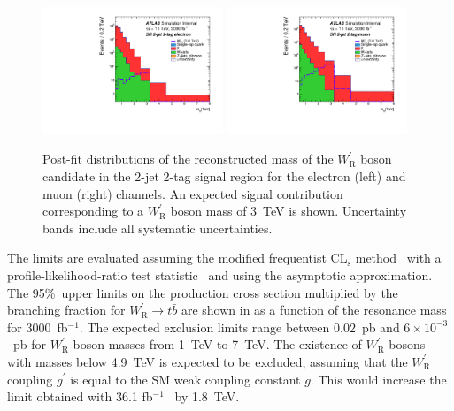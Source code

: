 \begin{figure}[t]
\centering
\includegraphics[width=0.48\textwidth]{./section7OtherSignatures/img/Wptb_2jets_2tag_el_14TeV.pdf}
\includegraphics[width=0.48\textwidth]{./section7OtherSignatures/img/Wptb_2jets_2tag_mu_14TeV.pdf}
\caption{Post-fit distributions of the reconstructed mass of the $W^\prime_{\mathrm{R}}$ boson candidate
  in the 2-jet 2-tag signal region for the electron (left) and muon (right) channels. 
  An expected signal contribution corresponding to a $W^\prime_{\mathrm{R}}$ boson mass of 3~TeV is shown.
  Uncertainty bands include all systematic uncertainties.}
\label{fig:SRmtb2jet}
\end{figure}

The limits are evaluated assuming the modified frequentist CL$_\text{s}$ method~\cite{Read:2002hq}
with a \sloppy\mbox{profile-likelihood-ratio} test statistic~\cite{Cowan:2010js} and using the asymptotic approximation. 
The 95\%~\cl upper limits on the production cross section multiplied by the 
branching fraction for $W^\prime_{\mathrm{R}} \rightarrow t\bar{b}$ are shown in 
as a function of the resonance mass for 3000~fb$^{-1}$.
The expected exclusion limits range between $0.02$~pb and $6\times 10^{-3}$~pb for
$W^\prime_{\mathrm{R}}$ boson masses from 1~TeV to 7~TeV.
The existence of $W^\prime_{\mathrm{R}}$ bosons with masses below 4.9~TeV is expected to be excluded,
assuming that the $W^\prime_{\mathrm{R}}$ coupling $g^\prime$ is equal to the SM weak coupling constant $g$. 
This would increase the limit obtained with 36.1 fb$^{-1}$~\cite{Aaboud:2018jux} by 1.8~TeV.

